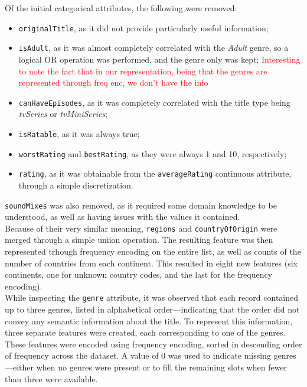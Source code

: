Of the initial categorical attributes, the following were removed:
\begin{itemize}
    \item \texttt{originalTitle}, as it did not provide particularly useful
    information;
    \item \texttt{isAdult}, as it was almost completely correlated with the
    \textit{Adult} genre, so a logical OR operation was performed, and the genre
    only was kept;
    \textcolor{red}{Interesting to note the fact that in our representation, being that
        the genres are represented through freq enc, we don't have the info}
    \item \texttt{canHaveEpisodes}, as it was completely correlated with the title type
    being \textit{tvSeries} or \textit{tvMiniSeries};
    \item \texttt{isRatable}, as it was always true;
    \item \texttt{worstRating} and \texttt{bestRating}, as they were always
    1 and 10, respectively;
    \item \texttt{rating}, as it was obtainable from the \texttt{averageRating}
    continuous attribute, through a simple discretization.
\end{itemize}

\texttt{soundMixes} was also removed, as it required some domain knowledge to be
understood, as well as having issues with the values it contained.\\
Because of their very similar meaning, \texttt{regions} and \texttt{countryOfOrigin}
were merged through a simple uniion operation. The resulting feature was then
represented trhough frequency encoding on the entire list, as well as
counts of the number of countries from each continent.
This resulted in eight new features (six continents, one for unknown country codes,
and the last for the frequency encoding).\\
While inspecting the \texttt{genre} attribute, it was observed that each record
contained up to three genres, listed in alphabetical order—indicating that the order
did not convey any semantic information about the title.
To represent this information, three separate features were created, each
corresponding to one of the genres. These features were encoded using frequency
encoding, sorted in descending order of frequency across the dataset.  
A value of 0 was used to indicate missing genres—either when no genres were present or
to fill the remaining slots when fewer than three were available.\\


